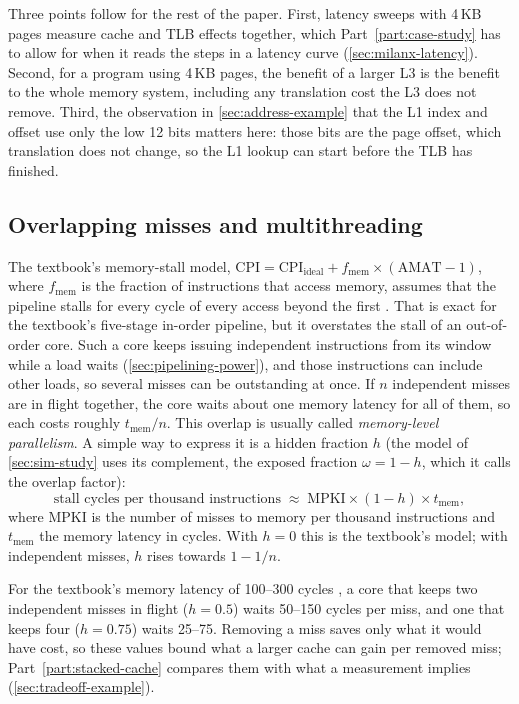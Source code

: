 Three points follow for the rest of the paper. First, latency sweeps with 4\,KB pages measure cache and TLB effects together, which Part~\ref{part:case-study} has to allow for when it reads the steps in a latency curve (\cref{sec:milanx-latency}). Second, for a program using 4\,KB pages, the benefit of a larger L3 is the benefit to the whole memory system, including any translation cost the L3 does not remove. Third, the observation in \cref{sec:address-example} that the L1 index and offset use only the low 12 bits matters here: those bits are the page offset, which translation does not change, so the L1 lookup can start before the TLB has finished.

\subsection{Overlapping misses and multithreading}
\label{sec:mlp}
The textbook's memory-stall model, $\mathrm{CPI} = \mathrm{CPI}_{\mathrm{ideal}} + f_{\mathrm{mem}} \times (\mathrm{AMAT} - 1)$, where $f_{\mathrm{mem}}$ is the fraction of instructions that access memory, assumes that the pipeline stalls for every cycle of every access beyond the first \cite[sec.~11.3.1]{sarangi2025basic}. That is exact for the textbook's five-stage in-order pipeline, but it overstates the stall of an out-of-order core. Such a core keeps issuing independent instructions from its window while a load waits (\cref{sec:pipelining-power}), and those instructions can include other loads, so several misses can be outstanding at once. If $n$ independent misses are in flight together, the core waits about one memory latency for all of them, so each costs roughly $t_{\mathrm{mem}}/n$. This overlap is usually called \emph{memory-level parallelism}. A simple way to express it is a hidden fraction $h$ (the model of \cref{sec:sim-study} uses its complement, the exposed fraction $\omega = 1 - h$, which it calls the overlap factor):
\begin{equation}
  \text{stall cycles per thousand instructions} \;\approx\; \mathrm{MPKI} \times (1 - h) \times t_{\mathrm{mem}},
  \label{eq:mlp-stall}
\end{equation}
where MPKI is the number of misses to memory per thousand instructions and $t_{\mathrm{mem}}$ the memory latency in cycles. With $h = 0$ this is the textbook's model; with independent misses, $h$ rises towards $1 - 1/n$.

For the textbook's memory latency of 100--300 cycles \cite[sec.~12.4.8]{sarangi2025basic}, a core that keeps two independent misses in flight ($h = 0.5$) waits 50--150 cycles per miss, and one that keeps four ($h = 0.75$) waits 25--75. Removing a miss saves only what it would have cost, so these values bound what a larger cache can gain per removed miss; Part~\ref{part:stacked-cache} compares them with what a measurement implies (\cref{sec:tradeoff-example}).

